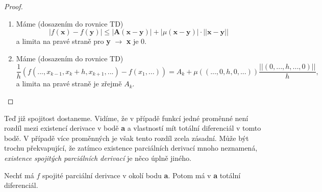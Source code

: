 \documentclass[../main.tex]{subfiles}
\begin{document}
\begin{proof}
	\begin{enumerate}
		\item Máme (dosazením do rovnice TD) \[|f(\textbf{x}) - f(\textbf{y})| \leq |\textbf{A}(\textbf{x}-\textbf{y})| + |\mu(\textbf{x}-\textbf{y})|\cdot||\textbf{x}-\textbf{y}||\]
		a limita na pravé straně pro \textbf{y} $\rightarrow$ \textbf{x} je 0.
		\item Máme (dosazením do rovnice TD) \[\frac{1}{h}(f(..., x_{k-1},x_k+h,x_{k+1},...) - f(x_1,...)) = A_k + \mu((...,0,h,0,...))\frac{||(0,...,h,...,0)||}{h},\]
		a limita na pravé straně je zřejmě $A_k$.
	\end{enumerate}
\end{proof}

Teď již spojitost dostaneme. Vidíme, že v případě funkcí jedné proměnné není rozdíl mezi existencí derivace v bodě \textbf{a} a vlastností
mít totální diferenciál v tomto bodě. V případě více proměnných je však tento rozdíl zcela zásadní. Může být trochu překvapující, že 
zatímco existence parciálních derivací mnoho neznamená, \textit{existence spojitých parciálních derivací} je něco úplně jiného.

\begin{theorem}
	Nechť má $f$ spojité parciální derivace v okolí bodu \textbf{a}. Potom má v \textbf{a} totální diferenciál.
\end{theorem}
\end{document}

